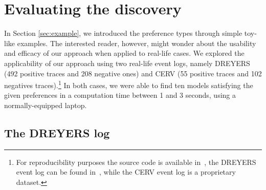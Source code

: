









\section{Evaluating the discovery}
\label{sec:evaluation}


In Section \ref{sec:example}, we introduced the preference types through simple toy-like examples. The interested reader, however, might wonder about the usability and efficacy of our approach when applied to real-life cases. We explored the applicability of our approach using %
two real-life event logs, namely DREYERS (492 positive traces and 208 negative ones) and CERV (55 positive traces and 102 negatives traces).\footnote{For reproducibility purposes the source code is available in~\cite{zenodo:experiments}, the DREYERS event log can be found in~\cite{DBLP:conf/ssci/DeboisS15,DBLP:conf/bpm/SlaatsDB21}, while the CERV event log is a proprietary dataset.} In both cases, we were able to find ten models satisfying the given preferences in a computation time between 1 and 3 seconds, using a normally-equipped laptop.



\subsection{The DREYERS log}
\label{subsec:dreyers}

